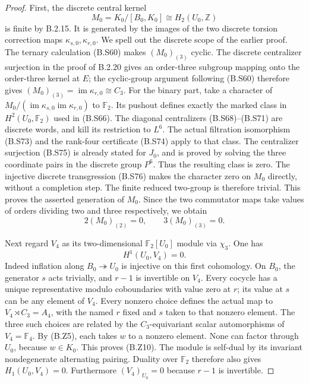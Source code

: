 \begin{proof}
First, the discrete central kernel
\[
 M_0=K_0/[B_0,K_0]\cong H_2(U_0,\mathbb Z)
 \tag{B.Z8}
\]
is finite by B.2.15.  It is generated by the images
of the two discrete torsion correction maps
$\kappa_{s,0},\kappa_{r,0}$.  We spell out the
discrete scope of the earlier proof.  The ternary
calculation (B.S60) makes $(M_0)_{(3)}$ cyclic.
The discrete centralizer surjection in the proof
of B.2.20 gives an order-three subgroup mapping
onto the order-three kernel at $E$; the cyclic-group
argument following (B.S60) therefore gives
$(M_0)_{(3)}=\operatorname{im}\kappa_{r,0}\cong C_3$.
For the binary part, take a character of
$M_0/(\operatorname{im}\kappa_{s,0}
\operatorname{im}\kappa_{r,0})$ to $\mathbb F_2$.
Its pushout defines exactly the marked class in
$H^2(U_0,\mathbb F_2)$ used in (B.S66).
The diagonal centralizers (B.S68)--(B.S71) are
discrete words, and kill its restriction to $L^6$.
The actual filtration isomorphism (B.S73) and the
rank-four certificate (B.S74) apply to that class.
The centralizer surjection (B.S75) is already stated
for $J_0$, and is proved by solving the three
coordinate pairs in the discrete group $P^6$.
Thus the resulting class is zero.  The injective
discrete transgression (B.S76) makes the character
zero on $M_0$ directly, without a completion step.
The finite reduced two-group is therefore trivial.
This proves the asserted generation of $M_0$.
Since the two commutator maps take values of orders
dividing two and three respectively, we obtain
\[
             2(M_0)_{(2)}=0,
                 \qquad 3(M_0)_{(3)}=0.
 \tag{B.Z9}
\]

Next regard $V_4$ as its two-dimensional
$\mathbb F_2[U_0]$ module via $\chi_3$.  One has
\[
                         H^1(U_0,V_4)=0.
 \tag{B.Z10}
\]
Indeed inflation along $B_0\twoheadrightarrow U_0$
is injective on this first cohomology.  On $B_0$,
the generator $s$ acts trivially, and $r-1$ is
invertible on $V_4$.  Every cocycle has a unique
representative modulo coboundaries with value zero
at $r$; its value at $s$ can be any element of
$V_4$.  Every nonzero choice defines the actual
map to $V_4\rtimes C_3=A_4$, with the named
$r$ fixed and $s$ taken to that nonzero element.
The three such choices are related by the
$C_3$-equivariant scalar automorphisms of
$V_4=\mathbb F_4$.  By (B.Z5), each takes $w$
to a nonzero element.  None can factor through
$U_0$, because $w\in K_0$.  This proves (B.Z10).
The module is self-dual by its invariant nondegenerate
alternating pairing.  Duality over $\mathbb F_2$
therefore also gives $H_1(U_0,V_4)=0$.
Furthermore $(V_4)_{U_0}=0$ because $r-1$ is
invertible.


\end{proof}
